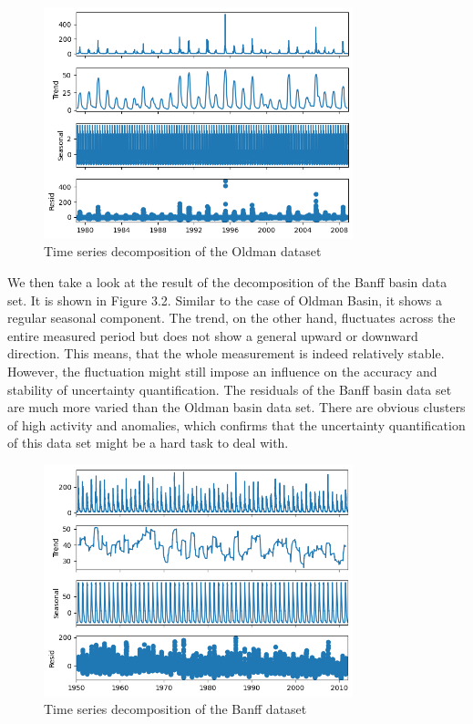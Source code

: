 \begin{figure}
    \centering
    \includegraphics[width=0.8\textwidth]{figures/dataset_time_series/Oldman.png}
    \captionsetup{width=.8\textwidth}
    \caption{Time series decomposition of the Oldman dataset}
    \label{fig:enter-label}
\end{figure}


We then take a look at the result of the decomposition of the Banff basin data set. It is shown in Figure 3.2. Similar to the case of Oldman Basin, it shows a regular seasonal component. The trend, on the other hand, fluctuates across the entire measured period but does not show a general upward or downward direction. This means, that the whole measurement is indeed relatively stable. However, the fluctuation might still impose an influence on the accuracy and stability of uncertainty quantification. The residuals of the Banff basin data set are much more varied than the Oldman basin data set. There are obvious clusters of high activity and anomalies, which confirms that the uncertainty quantification of this data set might be a hard task to deal with.

\begin{figure}
    \centering
    \includegraphics[width=0.8\textwidth]{figures/dataset_time_series/Banff.png}
    \captionsetup{width=.8\textwidth}
    \caption{Time series decomposition of the Banff dataset}
    \label{fig:enter-label}
\end{figure}

